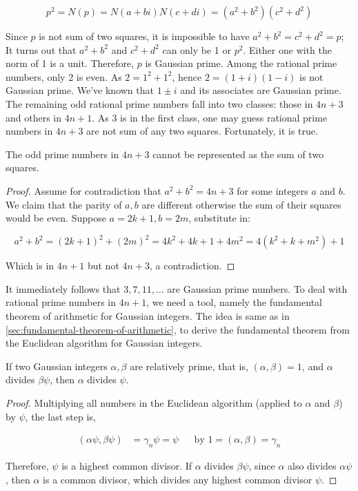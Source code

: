 \documentclass[b5paper]{article}
\begin{document}
\[
p^2 = N(p) = N(a + bi)N(c + di) = (a^2 + b^2)(c^2 + d^2)
\]

Since $p$ is not sum of two squares, it is impossible to have $a^2 + b^2 = c^2 + d^2 = p$; It turns out that $a^2 + b^2$ and $c^2 + d^2$ can only be 1 or $p^2$. Either one with the norm of 1 is a unit. Therefore, $p$ is Gaussian prime. Among the rational prime numbers, only 2 is even. As $2 = 1^2 + 1^2$, hence $2 = (1 + i)(1 - i)$ is not Gaussian prime. We've known that $1 \pm i$ and its associates are Gaussian prime. The remaining odd rational prime numbers fall into two classes: those in $4n + 3$ and others in $4n + 1$. As 3 is in the first class, one may guess rational prime numbers in $4n + 3$ are not sum of any two squares. Fortunately, it is true.

\begin{proposition}
The odd prime numbers in $4n + 3$ cannot be represented as the sum of two squares.
\end{proposition}

\begin{proof}
Assume for contradiction that $a^2 + b^2 = 4n + 3$ for some integers $a$ and $b$. We claim that the parity of $a, b$ are different otherwise the sum of their squares would be even. Suppose $a = 2k + 1, b = 2m$, substitute in:

\[
a^2 + b^2 = (2k + 1)^2 + (2m)^2 = 4k^2 + 4k + 1 + 4m^2 = 4(k^2 + k + m^2) + 1
\]

Which is in $4n + 1$ but not $4n + 3$, a contradiction.
\end{proof}

It immediately follows that $3, 7, 11, \dotsc$ are Gaussian prime numbers. To deal with rational prime numbers in $4n + 1$, we need a tool, namely the fundamental theorem of arithmetic for Gaussian integers. The idea is same as in \cref{sec:fundamental-theorem-of-arithmetic}, to derive the fundamental theorem from the Euclidean algorithm for Gaussian integers.

\begin{proposition}
If two Gaussian integers $\alpha, \beta$ are relatively prime, that is, $(\alpha, \beta) = 1$, and $\alpha$ divides $\beta \psi$, then $\alpha$ divides $\psi$.
\end{proposition}

\begin{proof}
Multiplying all numbers in the Euclidean algorithm (applied to $\alpha$ and $\beta$) by $\psi$, the last step is,

\begin{align*}
(\alpha \psi, \beta \psi) &= \gamma_n \psi = \psi  && \text{by } 1 = (\alpha, \beta) = \gamma_n
\end{align*}

Therefore, $\psi$ is a highest common divisor. If $\alpha$ divides $\beta \psi$, since $\alpha$ also divides $\alpha \psi$, then $\alpha$ is a common divisor, which divides any highest common divisor $\psi$.
\end{proof}
\end{document}

